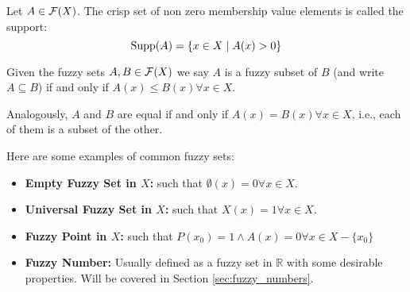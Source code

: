 \begin{definition}[Support]
    Let $A \in \mathcal{F}(X)$. The crisp set of non zero membership value elements is called the support:
    \[\textnormal{Supp}(A)=\{x\in X \mid A(x)>0\}\]
\end{definition}

\begin{definition}
    Given the fuzzy sets $A, B \in \mathcal{F}(X)$ we say $A$ is a fuzzy subset of $B$ (and write $A \subseteq B$) if and only if $A(x)
    \leq B(x) \forall x \in X$.

    Analogously, $A$ and $B$ are equal if and only if $A(x)=B(x) \forall x \in X$, i.e., each of them is a subset of the other.
\end{definition}

\begin{example}
    Here are some examples of common fuzzy sets:
    \begin{itemize}
        \item \textbf{Empty Fuzzy Set in $X$:} such that $\emptyset(x)=0 \forall x \in X$.
        \item \textbf{Universal Fuzzy Set in $X$:} such that $X(x)=1  \forall x \in X$.
        \item \textbf{Fuzzy Point in $X$:} such that $P(x_0)=1 \land A(x)=0 \forall x \in X-\{x_0\}$
        \item \textbf{Fuzzy Number:} Usually defined as a fuzzy set in $\mathbb{R}$ with some desirable properties. Will be covered in Section \ref{sec:fuzzy_numbers}.
    \end{itemize}
\end{example}
